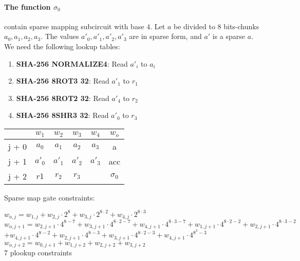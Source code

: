 \paragraph{The function $\sigma_0$} contain sparse mapping subcircuit with base $4$.
Let $a$ be divided to 8 bits-chunks $a_0, a_1, a_2, a_3$.
The values $a'_0, a'_1, a'_2, a'_3$ are in sparse form, and $a'$ is a sparse $a$.
We need the following lookup tables:
\begin{enumerate}
    \item \textbf{SHA-256 NORMALIZE4}: Read $a'_i$ to $a_i$
    \item \textbf{SHA-256 8ROT3 32}: Read $a'_1$ to $r_1$
    \item \textbf{SHA-256 8ROT2 32}: Read $a'_4$ to $r_2$
    \item \textbf{SHA-256 8SHR3 32}: Read $a'_0$ to $r_3$
\end{enumerate}
\begin{center}
    \begin{tabular}{ c|c|c|c|c|c }
        & $w_1$  & $w_2$  & $w_3$  & $w_4$  & $w_o$      \\
        \hline
        j + 0 & $a_0$  & $ a_1$ & $a_2$  & $a_3$  & a          \\
        j + 1 & $a'_0$ & $a'_1$ & $a'_2$ & $a'_3$ & acc        \\
        j + 2 & $r1 $  & $r_2$  & $r_3$  &        & $\sigma_0$ \\
    \end{tabular}
\end{center}
Sparse map gate constraints:
\begin{center}
    $w_{o,j} = w_{1,j} + w_{2,j} \cdot 2^8 + w_{3,j} \cdot 2^{8 \cdot 2} + w_{4,j} \cdot 2^{8 \cdot 3}$ \\
    $w_{o,j + 1} =  w_{2,j + 1} \cdot 4^{8 - 7} + w_{3,j + 1} \cdot 4^{8 \cdot 2 - 7} + w_{4,j + 1} \cdot 4^{8 \cdot 3 - 7}
    + w_{1,j + 1} \cdot 4^{8 \cdot 2 - 2} + w_{2,j + 1} \cdot 4^{8 \cdot 3 - 2}$ \\
    $+ w_{4,j + 1} \cdot 4^{8 - 2} + w_{2,j + 1} \cdot 4^{8 - 3} + w_{3,j + 1} \cdot 4^{8 \cdot 2 - 3}
    + w_{4,j + 1} \cdot 4^{8^3 - 3}$ \\
    $w_{o, j+2} = w_{0, j+1} + w_{1,j+2} + w_{2, j+2} + w_{3, j+2}$ \\
    7 plookup constraints \\
\end{center}

